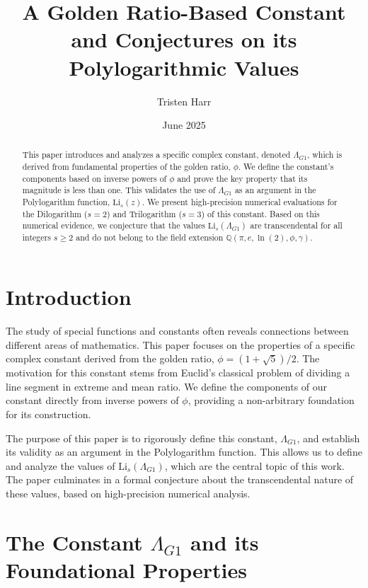 \documentclass{amsart}
\theoremstyle{plain}
\theoremstyle{definition}
\theoremstyle{remark}
\newcommand{\LambdaG}{\Lambda_{G1}}
\begin{document}
\title[A Golden Ratio Constant and its Polylogarithmic Values]{A Golden Ratio-Based Constant and Conjectures on its Polylogarithmic Values}
\author{Tristen Harr}
\date{June 2025}

\begin{abstract}
This paper introduces and analyzes a specific complex constant, denoted $\LambdaG$, which is derived from fundamental properties of the golden ratio, $\phi$. We define the constant's components based on inverse powers of $\phi$ and prove the key property that its magnitude is less than one. This validates the use of $\LambdaG$ as an argument in the Polylogarithm function, $\mathrm{Li}_s(z)$. We present high-precision numerical evaluations for the Dilogarithm ($s=2$) and Trilogarithm ($s=3$) of this constant. Based on this numerical evidence, we conjecture that the values $\mathrm{Li}_s(\LambdaG)$ are transcendental for all integers $s \ge 2$ and do not belong to the field extension $\mathbb{Q}(\pi, e, \ln(2), \phi, \gamma)$.
\end{abstract}

\maketitle

\section{Introduction}
The study of special functions and constants often reveals connections between different areas of mathematics. This paper focuses on the properties of a specific complex constant derived from the golden ratio, $\phi = (1+\sqrt{5})/2$. The motivation for this constant stems from Euclid's classical problem of dividing a line segment in extreme and mean ratio. We define the components of our constant directly from inverse powers of $\phi$, providing a non-arbitrary foundation for its construction.

The purpose of this paper is to rigorously define this constant, $\LambdaG$, and establish its validity as an argument in the Polylogarithm function. This allows us to define and analyze the values of $\mathrm{Li}_s(\LambdaG)$, which are the central topic of this work. The paper culminates in a formal conjecture about the transcendental nature of these values, based on high-precision numerical analysis.

\section{The Constant \texorpdfstring{$\Lambda_{G1}$}{Lambda\_G1} and its Foundational Properties}
\end{document}
